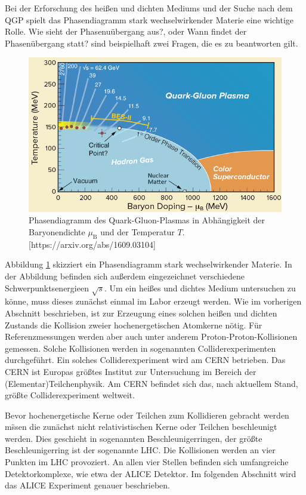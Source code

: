 Bei der Erforschung des hei{\ss}en und dichten Mediums und der Suche nach dem QGP spielt das Phasendiagramm stark wechselwirkender Materie eine wichtige Rolle.
\grqq{}Wie sieht der Phasenu\"ubergang aus?\grqq{}, oder \grqq{}Wann findet der Phasen\"ubergang statt?\grqq{} sind beispielhaft zwei Fragen, die es zu beantworten gilt.
\begin{figure}[tbp]
\centering
\includegraphics[width=.7\linewidth]{QGPPhaseDiagram.png}
\caption{Phasendiagramm des Quark-Gluon-Plasmas in Abh\"angigkeit der Baryonendichte $\mu_{\text{B}}$ und der Temperatur $T$.
[https://arxiv.org/abs/1609.03104]}
\label{fig:QGPPhase}
\end{figure}
Abbildung \ref{fig:QGPPhase} skizziert ein Phasendiagramm stark wechselwirkender Materie. In der Abbildung befinden sich au{\ss}erdem eingezeichnet verschiedene Schwerpunktsenergieen $\sqrt{s}$.
Um ein hei{\ss}es und dichtes Medium untersuchen zu k\"onne, muss dieses zun\"achst einmal im Labor erzeugt werden.
Wie im vorherigen Abschnitt beschrieben, ist zur Erzeugung eines solchen hei{\ss}en und dichten Zustands die Kollision zweier hochenergetischen Atomkerne n\"otig.
F\"ur Referenzmessungen werden aber auch unter anderem Proton-Proton-Kollisionen gemessen.
Solche Kollisionen werden in sogenannten Colliderexperimenten durchgef\"uhrt.
Ein solches Colliderexperiment wird am CERN betrieben.
Das CERN ist Europas gr\"o{\ss}tes Institut zur Untersuchung im Bereich der (Elementar)Teilchenphysik.
Am CERN befindet sich das, nach aktuellem Stand, gr\"o{\ss}te Colliderexperiment weltweit.

Bevor hochenergetische Kerne oder Teilchen zum Kollidieren gebracht werden m\"ssen die zun\"achst nicht relativistischen Kerne oder Teilchen beschleunigt werden.
Dies geschieht in sogenannten Beschleunigerringen, der gr\"o{\ss}te Beschleunigerring ist der sogenannte LHC.
Die Kollisionen werden an vier Punkten im LHC provoziert.
An allen vier Stellen befinden sich umfangreiche Detektorkomplexe, wie etwa der ALICE Detektor.
Im folgenden Abschnitt wird das ALICE Experiment genauer beschrieben.